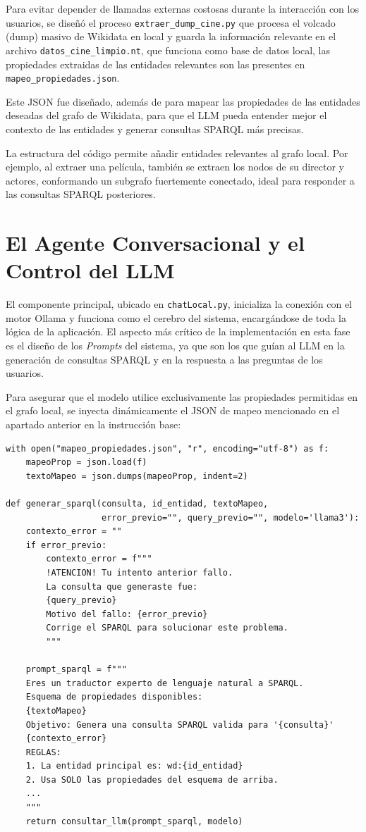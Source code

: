 Para evitar depender de llamadas externas costosas durante la interacción con los usuarios, se diseñó el proceso \texttt{extraer\_dump\_cine.py} que procesa el volcado (dump) masivo de Wikidata en local y guarda la información relevante en el archivo \texttt{datos\_cine\_limpio.nt}, que funciona como base de datos local, las propiedades extraidas de las entidades relevantes son las presentes en \texttt{mapeo\_propiedades.json}.

Este JSON fue diseñado, además de para mapear las propiedades de las entidades deseadas del grafo de Wikidata, para que el LLM pueda entender mejor el contexto de las entidades y generar consultas SPARQL más precisas.

La estructura del código permite añadir entidades relevantes al grafo local. Por ejemplo, al extraer una película, también se extraen los nodos de su director y actores, conformando un subgrafo fuertemente conectado, ideal para responder a las consultas SPARQL posteriores.

\section{El Agente Conversacional y el Control del LLM}

El componente principal, ubicado en \texttt{chatLocal.py}, inicializa la conexión con el motor Ollama y funciona como el cerebro del sistema, encargándose de toda la lógica de la aplicación. El aspecto más crítico de la implementación en esta fase es el diseño de los \textit{Prompts} del sistema, ya que son los que guían al LLM en la generación de consultas SPARQL y en la respuesta a las preguntas de los usuarios. 

Para asegurar que el modelo utilice exclusivamente las propiedades permitidas en el grafo local, se inyecta dinámicamente el JSON de mapeo mencionado en el apartado anterior en la instrucción base:

\begin{lstlisting}[style=Python-color, caption={Carga del mapeo de propiedades e inyección en el prompt SPARQL}, label=lst:prompt]
with open("mapeo_propiedades.json", "r", encoding="utf-8") as f:
    mapeoProp = json.load(f)
    textoMapeo = json.dumps(mapeoProp, indent=2)

def generar_sparql(consulta, id_entidad, textoMapeo,
                   error_previo="", query_previo="", modelo='llama3'):
    contexto_error = ""
    if error_previo:
        contexto_error = f"""
        !ATENCION! Tu intento anterior fallo.
        La consulta que generaste fue:
        {query_previo}
        Motivo del fallo: {error_previo}
        Corrige el SPARQL para solucionar este problema.
        """

    prompt_sparql = f"""
    Eres un traductor experto de lenguaje natural a SPARQL.
    Esquema de propiedades disponibles:
    {textoMapeo}
    Objetivo: Genera una consulta SPARQL valida para '{consulta}'
    {contexto_error}
    REGLAS:
    1. La entidad principal es: wd:{id_entidad}
    2. Usa SOLO las propiedades del esquema de arriba.
    ...
    """
    return consultar_llm(prompt_sparql, modelo)
\end{lstlisting}

